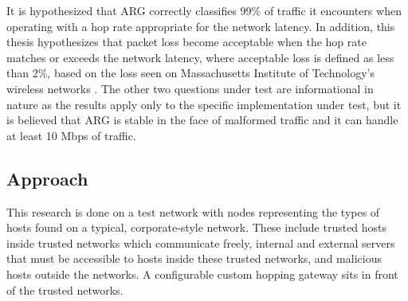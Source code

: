 

\par It is hypothesized that \ac{ARG} correctly classifies 99\% of traffic it encounters when operating with a hop rate appropriate for the network latency. In addition, this thesis hypothesizes that packet loss become acceptable when the hop rate matches or exceeds the network latency, where acceptable loss is defined as less than 2\%, based on the loss seen on Massachusetts Institute of Technology's wireless networks \cite{MITWifiLoss}. The other two questions under test are informational in nature as the results apply only to the specific implementation under test, but it is believed that \ac{ARG} is stable in the face of malformed traffic and it can handle at least 10 \ac{Mbps} of traffic. 

\subsection{Approach}
\label{sec:approach}
\par This research is done on a test network with nodes representing the types of hosts found on a typical, corporate-style network. These include trusted hosts inside trusted networks which communicate freely, internal and external servers that must be accessible to hosts inside these trusted networks, and malicious hosts outside the networks. A configurable custom hopping gateway sits in front of the trusted networks. 

